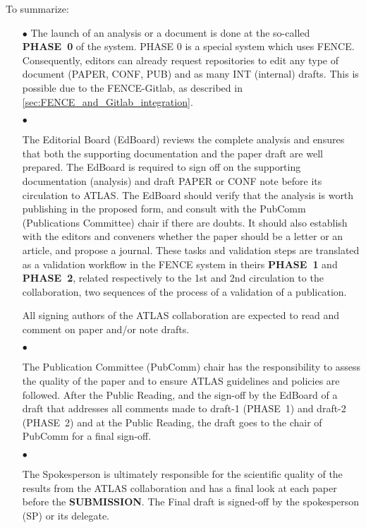 To summarize:
\begin{itemize}

    \item[$\bullet$]
The launch of an analysis or a document is done at the so-called \textbf{PHASE~0} of the system. PHASE 0 is a special system which uses FENCE. Consequently, editors can already request repositories to edit any type of document (PAPER, CONF, PUB) and as many INT (internal) drafts. This is possible due to the FENCE-Gitlab, as described in \cref{sec:FENCE_and_Gitlab_integration}.

    \item[$\bullet$]
    
The Editorial Board (EdBoard) reviews the complete analysis and ensures that both the supporting documentation and the paper draft are well prepared. The EdBoard is required to sign off on the supporting documentation (analysis) and draft PAPER or CONF note before its circulation to ATLAS. The EdBoard should verify that the analysis is worth publishing in the proposed form, and consult with the PubComm (Publications Committee) chair if there are doubts. It should also establish with the editors and conveners whether the paper should be a letter or an article, and propose a journal. These tasks and validation steps are translated as a validation workflow in the FENCE system in theirs \textbf{PHASE~1} and \textbf{PHASE~2}, related respectively to the 1st and 2nd circulation to the collaboration, two sequences of the process of a validation of a publication.

All signing authors of the ATLAS collaboration are expected to read and comment on paper and/or note drafts.

    \item[$\bullet$]

The Publication Committee (PubComm) chair has the responsibility to assess the quality of the paper and to ensure ATLAS guidelines and policies are followed. After the Public Reading, and the sign-off by the EdBoard of a draft  that addresses all comments made to draft-1 (PHASE~1) and draft-2 (PHASE~2)  and at the Public Reading, the draft goes to the chair of PubComm for a final sign-off.

    \item[$\bullet$]

The Spokesperson is ultimately responsible for the scientific quality of the results from the ATLAS collaboration and has a final look at each paper before the \textbf{SUBMISSION}. The Final draft  is signed-off by the spokesperson (SP) or its delegate. 


\end{itemize}

